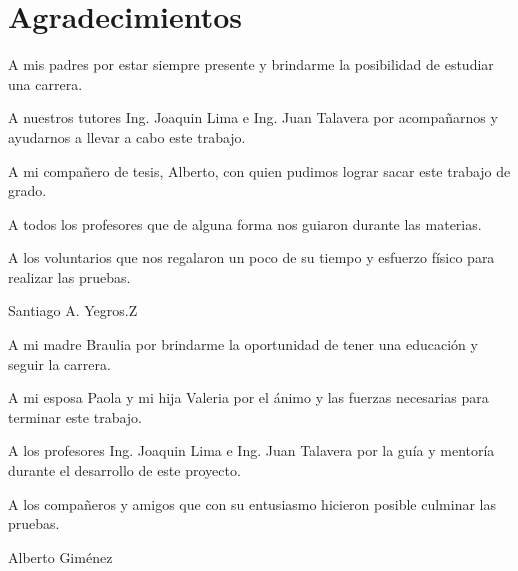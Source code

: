 
\chapter*{Agradecimientos}

A mis padres por estar siempre presente y brindarme la posibilidad de estudiar una carrera.

A nuestros tutores Ing. Joaquin Lima e Ing. Juan Talavera por acompañarnos y ayudarnos a llevar a cabo este trabajo.

A mi compañero de tesis, Alberto, con quien pudimos lograr sacar este trabajo de grado.

A todos los profesores que de alguna forma nos guiaron durante las materias.

A los voluntarios que nos regalaron un poco de su tiempo y esfuerzo físico para realizar las pruebas.

\begin{flushright}
	Santiago A. Yegros.Z
\end{flushright}

A mi madre Braulia por brindarme la oportunidad de tener una educación y seguir la carrera.

A mi esposa Paola y mi hija Valeria por el ánimo y las fuerzas necesarias para terminar este trabajo.

A los profesores Ing. Joaquin Lima e Ing. Juan Talavera por la guía y mentoría durante el desarrollo de este proyecto.

A los compañeros y amigos que con su entusiasmo hicieron posible culminar las pruebas.

\begin{flushright}
	Alberto Giménez
\end{flushright}

